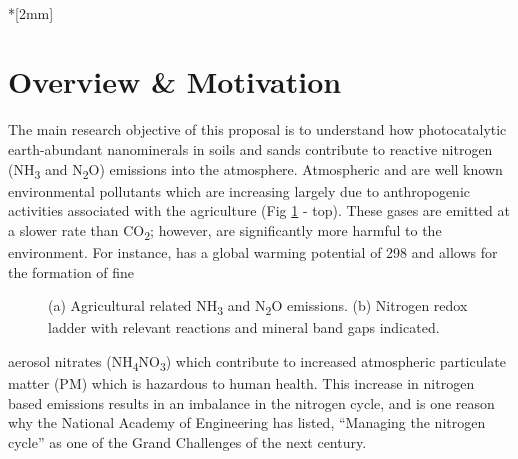 \renewcommand{\LeftFooter}{Project Description}
\renewcommand{\PageLimit}{15}
\begin{center}
\textbf{\textsf{\large \@title}} \\*[2mm]
\end{center}

\section{Overview \& Motivation} 
\vspace{1mm}


The main research objective of this proposal is to understand how photocatalytic earth-abundant nanominerals in soils and sands contribute to reactive nitrogen (NH\textsubscript{3}  and N\textsubscript{2}O) emissions into the atmosphere. Atmospheric \NH\hspace{.5mm} and \NO\hspace{.5mm} are well known environmental pollutants which are increasing largely due to anthropogenic activities associated with the agriculture (Fig \ref{fig:N2cycle} - top). These gases are emitted at a slower rate than CO\textsubscript{2}; however, are significantly more harmful to the environment.  For instance, \NO\hspace{.5mm} has a global warming potential of 298 and \NH\hspace{.5mm} allows for the formation of fine \begin{figure}
\centering
\vspace{-1mm}
\caption{(a) Agricultural related NH\textsubscript{3} and N\textsubscript{2}O emissions\cite{doane2017abiotic}. (b) Nitrogen redox ladder with relevant reactions and mineral band gaps indicated\cite{Medford_2017}.}
\label{fig:N2cycle}
\vspace{-2mm}
\end{figure}aerosol nitrates (NH\textsubscript{4}NO\textsubscript{3}) 
which contribute to increased atmospheric particulate matter (PM) which is hazardous to human health\cite{makar_2009}. This increase in nitrogen based emissions results in an imbalance in the nitrogen cycle, and is one reason why the National Academy of Engineering has listed, ``Managing the nitrogen cycle'' as one of the Grand Challenges of the next century. 


